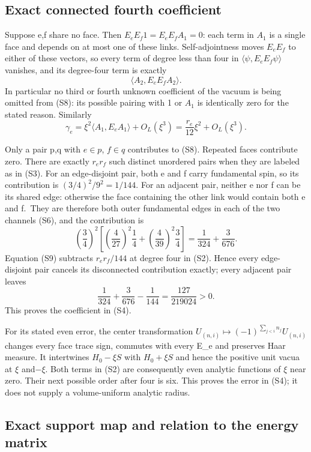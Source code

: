 \subsection{Exact connected fourth coefficient}\label{exact-connected-fourth-coefficient}

Suppose e,f share no face. Then \(E_eE_f1=E_eE_fA_1=0\): each term in \(A_1\) is a single face and depends on at most one of these links. Self-adjointness moves \(E_eE_f\) to either of these vectors, so every term of degree less than four in \(\langle\psi,E_eE_f\psi\rangle\) vanishes, and its degree-four term is exactly \[
 \langle A_2,E_eE_fA_2\rangle.
\tag{S8}
\] In particular no third or fourth unknown coefficient of the vacuum is being omitted from (S8): its possible pairing with 1 or \(A_1\) is identically zero for the stated reason. Similarly \[
 \gamma_e=\xi^2\langle A_1,E_eA_1\rangle+O_L(\xi^3)
          =\frac{r_e}{12}\xi^2+O_L(\xi^3).
\tag{S9}
\]

Only a pair p,q with \(e\in p\), \(f\in q\) contributes to (S8). Repeated faces contribute zero. There are exactly \(r_er_f\) such distinct unordered pairs when they are labeled as in (S3). For an edge-disjoint pair, both e and f carry fundamental spin, so its contribution is \((3/4)^2/9^2=1/144\). For an adjacent pair, neither e nor f can be its shared edge: otherwise the face containing the other link would contain both e and f.~They are therefore both outer fundamental edges in each of the two channels (S6), and the contribution is \[
 \left(\frac34\right)^2
 \left[\left(\frac4{27}\right)^2\frac14
       +\left(\frac4{39}\right)^2\frac34\right]
       =\frac1{324}+\frac3{676}.
\tag{S10}
\] Equation (S9) subtracts \(r_er_f/144\) at degree four in (S2). Hence every edge-disjoint pair cancels its disconnected contribution exactly; every adjacent pair leaves \[
 \frac1{324}+\frac3{676}-\frac1{144}
          =\frac{127}{219024}>0.
\tag{S11}
\] This proves the coefficient in (S4).

For its stated even error, the center transformation \(U_{(n,i)}\mapsto(-1)^{\sum_{j<i}n_j}U_{(n,i)}\) changes every face trace sign, commutes with every E\_e and preserves Haar measure. It intertwines \(H_0-\xi S\) with \(H_0+\xi S\) and hence the positive unit vacua at \(\xi\) and\(-\)\(\xi\). Both terms in (S2) are consequently even analytic functions of \(\xi\) near zero. Their next possible order after four is six. This proves the error in (S4); it does not supply a volume-uniform analytic radius.

\subsection{Exact support map and relation to the energy matrix}\label{exact-support-map-and-relation-to-the-energy-matrix}

